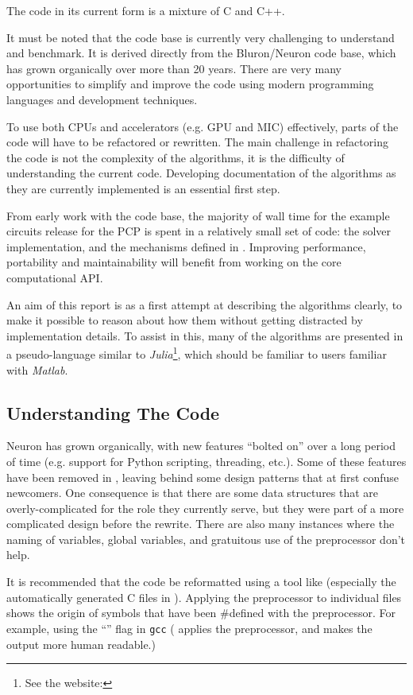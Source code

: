 The code in its current form is a mixture of C and C++.

It must be noted that the code base is currently very challenging to understand and benchmark. It is derived directly from the Bluron/Neuron code base, which has grown organically over more than 20 years. There are very many opportunities to simplify and improve the code using modern programming languages and development techniques.

To use both CPUs and accelerators (e.g. GPU and MIC) effectively, parts of the code will have to be refactored or rewritten. The main challenge in refactoring the code is not the complexity of the algorithms, it is the difficulty of understanding the current code. Developing documentation of the algorithms as they are currently implemented is an essential first step.

From early work with the code base, the majority of wall time for the example circuits release for the PCP is spent in a relatively small set of code: the  solver implementation, and the mechanisms defined in . Improving performance, portability and maintainability will benefit from working on the core computational API.

An aim of this report is as a first attempt at describing the algorithms clearly, to make it possible to reason about how them without getting distracted by implementation details. To assist in this, many of the algorithms are presented in a pseudo-language similar to \emph{Julia}\footnote{See the website: }, which should be familiar to users familiar with \emph{Matlab}.

\subsection{Understanding The Code}
Neuron has grown organically, with new features ``bolted on'' over a long period of time (e.g. support for Python scripting, threading, etc.).
Some of these features have been removed in \neuron, leaving behind some design patterns that at first confuse newcomers.
One consequence is that there are some data structures that are overly-complicated for the role they currently serve, but they were part of a more complicated design before the \neuron rewrite.
There are also many instances where the naming of variables, global variables, and gratuitous use of the preprocessor don't help.
\begin{note}
It is recommended that the code be reformatted using a tool like  (especially the automatically generated C files in ). Applying the preprocessor to individual files shows the origin of symbols that have been \#defined with the preprocessor. For example, using the ``'' flag in \texttt{gcc} ( applies the preprocessor, and  makes the output more human readable.)
\end{note}

